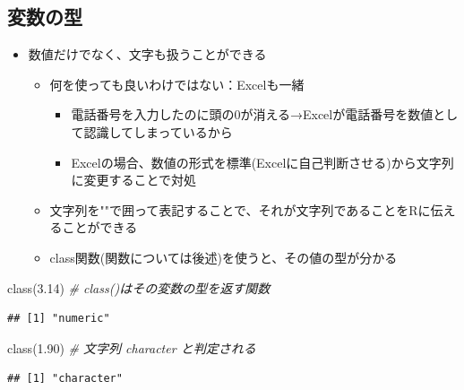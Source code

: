\documentclass[
]{ltjsarticle}
\newenvironment{Shaded}{\begin{snugshade}}{\end{snugshade}}
\newcommand{\CommentTok}[1]{\textcolor[rgb]{0.56,0.35,0.01}{\textit{#1}}}
\newcommand{\FloatTok}[1]{\textcolor[rgb]{0.00,0.00,0.81}{#1}}
\newcommand{\FunctionTok}[1]{\textcolor[rgb]{0.00,0.00,0.00}{#1}}
\newcommand{\NormalTok}[1]{#1}
\newcommand{\StringTok}[1]{\textcolor[rgb]{0.31,0.60,0.02}{#1}}
\providecommand{\tightlist}{%
  \setlength{\itemsep}{0pt}\setlength{\parskip}{0pt}}
\begin{document}
\hypertarget{ux5909ux6570ux306eux578b}{%
\subsection{変数の型}\label{ux5909ux6570ux306eux578b}}

\begin{itemize}
\tightlist
\item
  数値だけでなく、文字も扱うことができる

  \begin{itemize}
  \tightlist
  \item
    何を使っても良いわけではない：Excelも一緒

    \begin{itemize}
    \tightlist
    \item
      電話番号を入力したのに頭の0が消える→Excelが電話番号を数値として認識してしまっているから
    \item
      Excelの場合、数値の形式を標準(Excelに自己判断させる)から文字列に変更することで対処
    \end{itemize}
  \item
    文字列を""で囲って表記することで、それが文字列であることをRに伝えることができる
  \item
    class関数(関数については後述)を使うと、その値の型が分かる
  \end{itemize}
\end{itemize}

\begin{Shaded}
\begin{Highlighting}[]
\FunctionTok{class}\NormalTok{(}\FloatTok{3.14}\NormalTok{) }\CommentTok{\# class()はその変数の型を返す関数}
\end{Highlighting}
\end{Shaded}

\begin{verbatim}
## [1] "numeric"
\end{verbatim}

\begin{Shaded}
\begin{Highlighting}[]
\FunctionTok{class}\NormalTok{(}\StringTok{\textquotesingle{}1.90\textquotesingle{}}\NormalTok{) }\CommentTok{\# 文字列 character と判定される}
\end{Highlighting}
\end{Shaded}

\begin{verbatim}
## [1] "character"
\end{verbatim}
\end{document}
